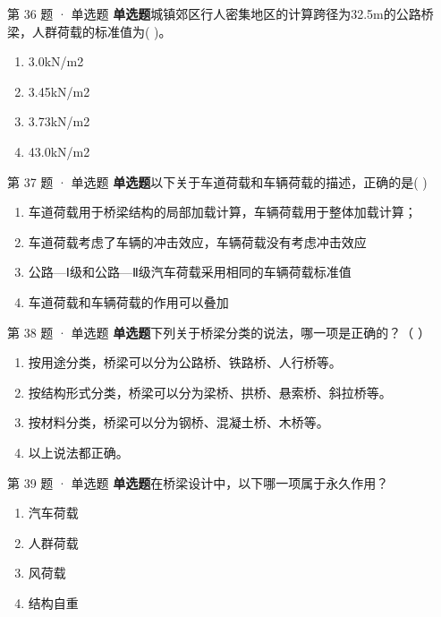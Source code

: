 \documentclass[UTF8,zihao=-4,openany]{ctexbook}
\newenvironment{choices}{\begin{enumerate}[label=\Alph*.,leftmargin=9mm,labelsep=3mm,itemsep=2pt,topsep=4pt]}{\end{enumerate}}
\newcommand{\qtype}[1]{\textcolor{brand}{\sffamily\bfseries #1}}
\begin{document}
\begin{questionbox}{第 36 题 · 单选题}
\qtype{单选题}\quad 城镇郊区行人密集地区的计算跨径为32.5m的公路桥梁，人群荷载的标准值为( )。
\begin{choices}
\item 3.0kN/m2
\item 3.45kN/m2
\item 3.73kN/m2
\item 43.0kN/m2
\end{choices}
\end{questionbox}

\begin{questionbox}{第 37 题 · 单选题}
\qtype{单选题}\quad 以下关于车道荷载和车辆荷载的描述，正确的是( )
\begin{choices}
\item 车道荷载用于桥梁结构的局部加载计算，车辆荷载用于整体加载计算；
\item 车道荷载考虑了车辆的冲击效应，车辆荷载没有考虑冲击效应
\item 公路—Ⅰ级和公路—Ⅱ级汽车荷载采用相同的车辆荷载标准值
\item 车道荷载和车辆荷载的作用可以叠加
\end{choices}
\end{questionbox}

\begin{questionbox}{第 38 题 · 单选题}
\qtype{单选题}\quad 下列关于桥梁分类的说法，哪一项是正确的？（ ）
\begin{choices}
\item 按用途分类，桥梁可以分为公路桥、铁路桥、人行桥等。
\item 按结构形式分类，桥梁可以分为梁桥、拱桥、悬索桥、斜拉桥等。
\item 按材料分类，桥梁可以分为钢桥、混凝土桥、木桥等。
\item 以上说法都正确。
\end{choices}
\end{questionbox}

\begin{questionbox}{第 39 题 · 单选题}
\qtype{单选题}\quad 在桥梁设计中，以下哪一项属于永久作用？
\begin{choices}
\item 汽车荷载
\item 人群荷载
\item 风荷载
\item 结构自重
\end{choices}
\end{questionbox}
\end{document}
